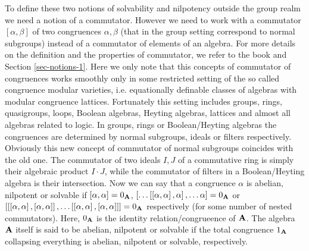 \documentclass[11pt,a4paper]{amsart}
\newcommand{\m}[1]{{\uppercase {\bf{#1}}}}
\newcounter{note}
\newcommand{\comm}[2]{\left[ #1 , #2 \right]}
\begin{document}
To define these two notions of solvability and nilpotency outside the group realm we need a notion of a commutator. However we need to work with a commutator $\comm{\alpha}{\beta}$ of two congruences $\alpha,\beta$ (that in the group setting correspond to normal subgroups) instead of a commutator of elements of an algebra. 
For more details on the definition and the properties of commutator, we refer to the book \cite{fm} and Section \ref{sec-notions-1}.
Here we only note that this concepts of commutator of congruences works smoothly only in some restricted setting of the so called congruence modular varieties, i.e. equationally definable classes of algebras with modular congruence lattices.
Fortunately this setting includes groups, rings, quasigroups, loops, Boolean algebras, Heyting algebras, lattices and almost all algebras related to logic.
In groups, rings or Boolean/Heyting algebras the congruences are determined by normal subgroups, ideals or filters respectively.
Obviously this new concept of commutator of normal subgroups coincides with the old one. 
The commutator of two ideals $I,J$ of a commutative ring 
is simply their algebraic product $I\cdot J$, 
while the commutator of filters in a Boolean/Heyting algebra is their intersection. 
Now we can say that a congruence $\alpha$ is abelian, nilpotent or solvable if  $\comm{\alpha}{\alpha}=0_{\m A}$, 
$\comm{\ldots\comm{\comm{\alpha}{\alpha}}{\alpha}}{\ldots\alpha}=0_{\m A}$
or
$\comm{\comm{\comm{\alpha}{\alpha}}{\comm{\alpha}{\alpha}}}
{\ldots\comm{\comm{\alpha}{\alpha}}{\comm{\alpha}{\alpha}}}=0_{\m A}$ respectively (for some number of nested commutators). 
Here, $0_{\m A}$ is the identity relation/congrueence of $\m A$.
The algebra $\m A$ itself is said to be abelian, nilpotent or solvable if the total congruence $1_{\m A}$ collapsing everything is abelian, nilpotent or solvable, respectively.
\end{document}
